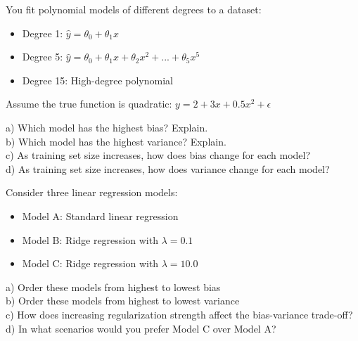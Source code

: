 \documentclass{article}
\newcounter{exercise}
\begin{document}
\begin{tcolorbox}[colback=gray!5!white,colframe=gray!75!black,title=Problem \stepcounter{exercise}: Polynomial Regression Analysis]

You fit polynomial models of different degrees to a dataset:
\begin{itemize}
    \item Degree 1: $\hat{y} = \theta_0 + \theta_1 x$
    \item Degree 5: $\hat{y} = \theta_0 + \theta_1 x + \theta_2 x^2 + ... + \theta_5 x^5$
    \item Degree 15: High-degree polynomial
\end{itemize}

Assume the true function is quadratic: $y = 2 + 3x + 0.5x^2 + \epsilon$

a) Which model has the highest bias? Explain.\\
b) Which model has the highest variance? Explain.\\
c) As training set size increases, how does bias change for each model?\\
d) As training set size increases, how does variance change for each model?
\end{tcolorbox}

\begin{tcolorbox}[colback=gray!5!white,colframe=gray!75!black,title=Problem \stepcounter{exercise}: Regularization Effects]

Consider three linear regression models:
\begin{itemize}
    \item Model A: Standard linear regression
    \item Model B: Ridge regression with $\lambda = 0.1$
    \item Model C: Ridge regression with $\lambda = 10.0$
\end{itemize}

a) Order these models from highest to lowest bias\\
b) Order these models from highest to lowest variance\\
c) How does increasing regularization strength affect the bias-variance trade-off?\\
d) In what scenarios would you prefer Model C over Model A?
\end{tcolorbox}
\end{document}
